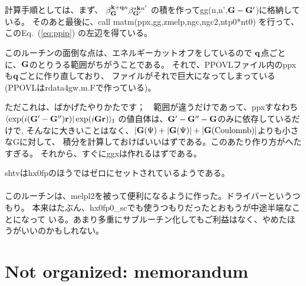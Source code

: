 \documentclass[a4paper,10pt,aip,onecolumn,amsmath,amssymb,floatfix,rmp]{revtex4-1}
\newcommand{\bfq}{{\bf q}}
\newcommand{\bfk}{{\bf k}}
\newcommand{\bfr}{{\bf r}}
\newcommand{\bfG}{{\bf G}}
\newcommand{\req}[1]{\mbox{Eq.~\!(\ref{#1})}}
\begin{document}
計算手順としては、まず、
$\beta^{\bfk+\bfq n}_{\bfG} \beta^{* \bfk n'}_{\bfG'}$
の積を作ってgg(n,n',$\bfG-\bfG'$)に格納している。
そのあと最後に、call matm(ppx,gg,zmelp,ngc,ngc2,ntp0*nt0)
を行って、この\req{eq:ppip} の左辺を得ている。

このルーチンの面倒な点は、エネルギーカットオフをしているので
$\bfq$点ごとに、$\bfG$のとりうる範囲がちがうことである。
それで、PPOVLファイル内のppxも$\bfq$ごとに作り直しており、
ファイルがそれで巨大になってしまっている(PPOVLはrdata4gw.m.Fで作っている)。

ただこれは、ばかげたやりかたです；　範囲が違うだけであって、ppxすなわち
$\langle \exp(i (\bfG'- \bfG'')\bfr) |\exp(i \bfG\bfr)\rangle_{\rm I}$
の値自体は、$\bfG'- \bfG''-\bfG$のみに依存しているだけで,
そんなに大きいことはなく、$|\bfG(\Psi)+|\bfG(\Psi)|+|\bfG({\rm Coulomnb})|$よりも小さなGに対して、
積分を計算しておけばいいはずである。このあたり作り方がへたすぎる。
それから、すぐにggxは作れるはずである。

shtvはhx0fpのほうではゼロにセットされているようである。\\

\\
このルーチンは、melpl2を被って便利になるように作った。ドライバーというつもり。
本来はたぶん、hx0fp0\_scでも使うつもりだったとおもうが中途半端なことになって
いる。あまり多重にサブルーチン化してもご利益はなく、やめたほうがいいのかもしれない。


\section{Not organized: memorandum}
\end{document}
